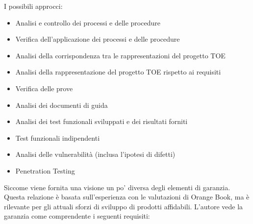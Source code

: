 \singlespacing

I possibili approcci:
\begin{itemize}
    \item Analisi e controllo dei processi e delle procedure
    
    \item Verifica dell'applicazione dei processi e delle procedure

    \item Analisi della corrispondenza tra le rappresentazioni del progetto TOE
    
    \item Analisi della rappresentazione del progetto TOE rispetto ai requisiti
    
    \item Verifica delle prove
    
    \item Analisi dei documenti di guida
    
    \item Analisi dei test funzionali sviluppati e dei risultati forniti
    
    \item Test funzionali indipendenti
    
    \item Analisi delle vulnerabilità (inclusa l'ipotesi di difetti)
    
    \item Penetration Testing
\end{itemize}
Siccome viene fornita una visione un po' diversa degli elementi di garanzia. Questa relazione è basata sull'esperienza con le valutazioni di Orange Book, ma è rilevante per gli attuali sforzi di sviluppo di prodotti affidabili. L'autore vede la garanzia come comprendente i seguenti requisiti:
